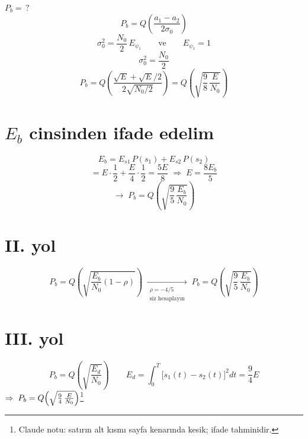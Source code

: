 \documentclass[11pt,a4paper]{article}
\begin{document}
\noindent $P_b=\,?$
\[ P_b = Q\!\left(\frac{a_1-a_2}{2\sigma_0}\right) \]
\[ \sigma_0^2=\frac{N_0}{2}\,E_{\psi_1} \qquad \text{ve} \qquad E_{\psi_1}=1 \]
\[ \sigma_0^2=\frac{N_0}{2} \]
\[ P_b = Q\!\left(\frac{\sqrt{E}+\sqrt{E}/2}{2\sqrt{N_0/2}}\right)=Q\!\left(\sqrt{\frac{9}{8}\,\frac{E}{N_0}}\right) \]

\section{$E_b$ cinsinden ifade edelim}
\[ E_b = E_{s1}\,P(s_1)+E_{s2}\,P(s_2) \]
\[ = E\cdot\frac{1}{2}+\frac{E}{4}\cdot\frac{1}{2}=\frac{5E}{8}\;\Rightarrow\; E=\frac{8E_b}{5} \]
\[ \rightarrow\; P_b = Q\!\left(\sqrt{\frac{9}{5}\,\frac{E_b}{N_0}}\right) \]

\section{II. yol}
\[ P_b = Q\!\left(\sqrt{\frac{E_b}{N_0}(1-\rho)}\right) \;\xrightarrow[\substack{\rho=-4/5\\ \text{siz hesaplayın}}]{}\; P_b = Q\!\left(\sqrt{\frac{9}{5}\,\frac{E_b}{N_0}}\right) \]

\section{III. yol}
\[ P_b = Q\!\left(\sqrt{\frac{E_d}{N_0}}\right) \qquad E_d=\int_0^T\bigl[s_1(t)-s_2(t)\bigr]^2dt=\frac{9}{4}E \]
\noindent $\Rightarrow\; P_b = Q\Bigl(\sqrt{\tfrac{9}{4}\,\tfrac{E}{N_0}}\Bigr)$\footnote{Claude notu: satırın alt kısmı sayfa kenarında kesik; ifade tahminidir.}
\end{document}
